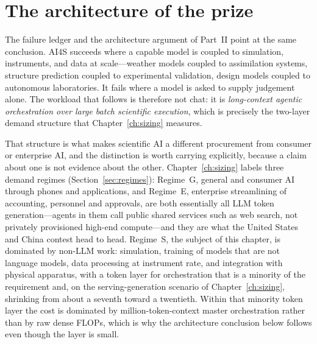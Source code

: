 \section{The architecture of the prize}
\label{sec:prize-arch}

The failure ledger and the architecture argument of Part~II point at the same conclusion. AI4S succeeds where a capable model is coupled to simulation, instruments, and data at scale---weather models coupled to assimilation systems, structure prediction coupled to experimental validation, design models coupled to autonomous laboratories. It fails where a model is asked to supply judgement alone. The workload that follows is therefore not chat: it is \emph{long-context agentic orchestration over large batch scientific execution}, which is precisely the two-layer demand structure that Chapter~\ref{ch:sizing} measures.

That structure is what makes scientific AI a different procurement from consumer or enterprise AI, and the distinction is worth carrying explicitly, because a claim about one is not evidence about the other. Chapter~\ref{ch:sizing} labels three demand regimes (Section~\ref{sec:regimes}): Regime~G, general and consumer AI through phones and applications, and Regime~E, enterprise streamlining of accounting, personnel and approvals, are both essentially all LLM token generation---agents in them call public shared services such as web search, not privately provisioned high-end compute---and they are what the United States and China contest head to head. Regime~S, the subject of this chapter, is dominated by non-LLM work: simulation, training of models that are not language models, data processing at instrument rate, and integration with physical apparatus, with a token layer for orchestration that is a minority of the requirement and, on the serving-generation scenario of Chapter~\ref{ch:sizing}, shrinking from about a seventh toward a twentieth. Within that minority token layer the cost is dominated by million-token-context master orchestration rather than by raw dense FLOPs, which is why the architecture conclusion below follows even though the layer is small.


